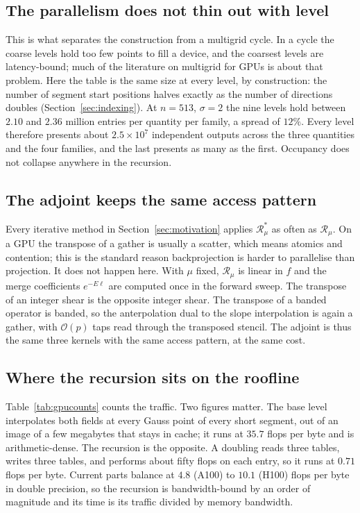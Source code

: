 \documentclass[11pt]{article}
\newcommand{\Rmu}{\mathcal{R}_{\mu}}
\newcommand{\bigO}{\mathcal{O}}
\begin{document}
\subsection{The parallelism does not thin out with level}

This is what separates the construction from a multigrid cycle. In a cycle the
coarse levels hold too few points to fill a device, and the coarsest levels are
latency-bound; much of the literature on multigrid for GPUs is about that
problem. Here the table is the same size at every level, by construction: the
number of segment start positions halves exactly as the number of directions
doubles (Section~\ref{sec:indexing}). At $n=513$, $\sigma=2$ the nine levels
hold between $2.10$ and $2.36$ million entries per quantity per family, a
spread of $12\%$. Every level therefore presents about $2.5\times10^{7}$
independent outputs across the three quantities and the four families, and the
last presents as many as the first. Occupancy does not collapse anywhere in
the recursion.

\subsection{The adjoint keeps the same access pattern}

Every iterative method in Section~\ref{sec:motivation} applies $\Rmu^{*}$ as
often as $\Rmu$. On a GPU the transpose of a gather is usually a scatter,
which means atomics and contention; this is the standard reason backprojection
is harder to parallelise than projection. It does not happen here. With $\mu$
fixed, $\Rmu$ is linear in $f$ and the merge coefficients $e^{-E\ell}$ are
computed once in the forward sweep. The transpose of an integer shear is the
opposite integer shear. The transpose of a banded operator is banded, so the
anterpolation dual to the slope interpolation is again a gather, with
$\bigO(p)$ taps read through the transposed stencil. The adjoint is thus the
same three kernels with the same access pattern, at the same cost.

\subsection{Where the recursion sits on the roofline}

Table~\ref{tab:gpucounts} counts the traffic. Two figures matter. The base
level interpolates both fields at every Gauss point of every short segment,
out of an image of a few megabytes that stays in cache; it runs at $35.7$
flops per byte and is arithmetic-dense. The recursion is the opposite. A
doubling reads three tables, writes three tables, and performs about fifty
flops on each entry, so it runs at $0.71$ flops per byte. Current parts
balance at $4.8$ (A100) to $10.1$ (H100) flops per byte in double precision,
so the recursion is bandwidth-bound by an order of magnitude and its time is
its traffic divided by memory bandwidth.
\end{document}
